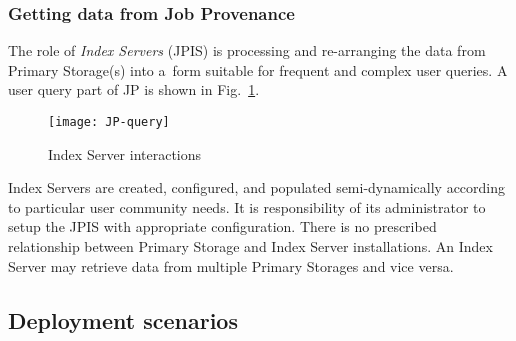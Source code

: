 \subsubsection{Getting data from Job Provenance}

The role of \emph{Index Servers} (JPIS) is processing and re-arranging the data
from Primary Storage(s) into a~form suitable for frequent and complex user
queries. A user query part of JP is shown in Fig.~\ref{fig:query}.

\begin{figure}[htpb]
  \centering
  \texttt{[image: JP-query]}
  \caption{Index Server interactions}
  \label{fig:query}
\end{figure}

Index Servers are created, configured, and populated semi-dynamically
according to particular user community needs.  It is responsibility of
its administrator to setup the JPIS with appropriate configuration. There
is no prescribed relationship between Primary Storage and Index Server
installations.  An Index Server may retrieve data from multiple
Primary Storages and vice versa.





%
\subsection{Deployment scenarios}

